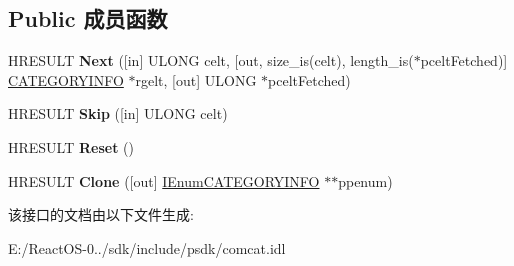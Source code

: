 \subsection*{Public 成员函数}
\begin{DoxyCompactItemize}
\item 
\mbox{\label{interface_i_enum_c_a_t_e_g_o_r_y_i_n_f_o_a9405fef10f96b36a1a73f8a9339c0228}} 
H\+R\+E\+S\+U\+LT {\bfseries Next} (\mbox{[}in\mbox{]} U\+L\+O\+NG celt, \mbox{[}out, size\+\_\+is(celt), length\+\_\+is($\ast$pcelt\+Fetched)\mbox{]} \hyperlink{struct_i_enum_c_a_t_e_g_o_r_y_i_n_f_o_1_1tag_c_a_t_e_g_o_r_y_i_n_f_o}{C\+A\+T\+E\+G\+O\+R\+Y\+I\+N\+FO} $\ast$rgelt, \mbox{[}out\mbox{]} U\+L\+O\+NG $\ast$pcelt\+Fetched)
\item 
\mbox{\label{interface_i_enum_c_a_t_e_g_o_r_y_i_n_f_o_acd44aaad0b3818e078c8ff9f3108680b}} 
H\+R\+E\+S\+U\+LT {\bfseries Skip} (\mbox{[}in\mbox{]} U\+L\+O\+NG celt)
\item 
\mbox{\label{interface_i_enum_c_a_t_e_g_o_r_y_i_n_f_o_ade58217f054b12dc5b664e5009f7c3b2}} 
H\+R\+E\+S\+U\+LT {\bfseries Reset} ()
\item 
\mbox{\label{interface_i_enum_c_a_t_e_g_o_r_y_i_n_f_o_aac608f90dc11e53c4236a720656b24cc}} 
H\+R\+E\+S\+U\+LT {\bfseries Clone} (\mbox{[}out\mbox{]} \hyperlink{interface_i_enum_c_a_t_e_g_o_r_y_i_n_f_o}{I\+Enum\+C\+A\+T\+E\+G\+O\+R\+Y\+I\+N\+FO} $\ast$$\ast$ppenum)
\end{DoxyCompactItemize}


该接口的文档由以下文件生成\+:\begin{DoxyCompactItemize}
\item 
E\+:/\+React\+O\+S-\/0../sdk/include/psdk/comcat.\+idl\end{DoxyCompactItemize}
